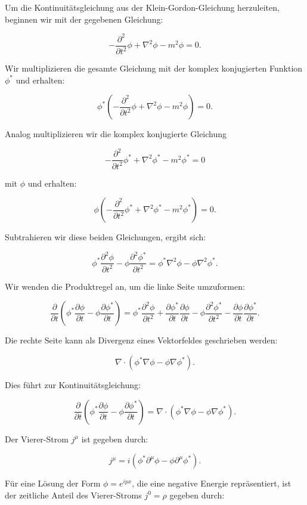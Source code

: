 Um die Kontinuitätsgleichung aus der Klein-Gordon-Gleichung herzuleiten, beginnen wir mit der gegebenen Gleichung:

\[
-\frac{\partial^2}{\partial t^2} \phi + \nabla^2 \phi - m^2 \phi = 0.
\]

Wir multiplizieren die gesamte Gleichung mit der komplex konjugierten Funktion \(\phi^*\) und erhalten:

\[
\phi^* \left(-\frac{\partial^2}{\partial t^2} \phi + \nabla^2 \phi - m^2 \phi \right) = 0.
\]

Analog multiplizieren wir die komplex konjugierte Gleichung

\[
-\frac{\partial^2}{\partial t^2} \phi^* + \nabla^2 \phi^* - m^2 \phi^* = 0
\]

mit \(\phi\) und erhalten:

\[
\phi \left(-\frac{\partial^2}{\partial t^2} \phi^* + \nabla^2 \phi^* - m^2 \phi^* \right) = 0.
\]

Subtrahieren wir diese beiden Gleichungen, ergibt sich:

\[
\phi^* \frac{\partial^2 \phi}{\partial t^2} - \phi \frac{\partial^2 \phi^*}{\partial t^2} = \phi^* \nabla^2 \phi - \phi \nabla^2 \phi^*.
\]

Wir wenden die Produktregel an, um die linke Seite umzuformen:

\[
\frac{\partial}{\partial t} \left(\phi^* \frac{\partial \phi}{\partial t} - \phi \frac{\partial \phi^*}{\partial t}\right) = \phi^* \frac{\partial^2 \phi}{\partial t^2} + \frac{\partial \phi^*}{\partial t} \frac{\partial \phi}{\partial t} - \phi \frac{\partial^2 \phi^*}{\partial t^2} - \frac{\partial \phi}{\partial t} \frac{\partial \phi^*}{\partial t}.
\]

Die rechte Seite kann als Divergenz eines Vektorfeldes geschrieben werden:

\[
\nabla \cdot \left(\phi^* \nabla \phi - \phi \nabla \phi^*\right).
\]

Dies führt zur Kontinuitätsgleichung:

\[
\frac{\partial}{\partial t} \left(\phi^* \frac{\partial \phi}{\partial t} - \phi \frac{\partial \phi^*}{\partial t}\right) = \nabla \cdot \left(\phi^* \nabla \phi - \phi \nabla \phi^*\right).
\]

Der Vierer-Strom \(j^\mu\) ist gegeben durch:

\[
j^\mu = i\left(\phi^* \partial^\mu \phi - \phi \partial^\mu \phi^*\right).
\]

Für eine Lösung der Form \(\phi = e^{i p x}\), die eine negative Energie repräsentiert, ist der zeitliche Anteil des Vierer-Stroms \(j^0 = \rho\) gegeben durch:

